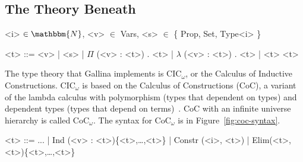 \subsection{The Theory Beneath}
\label{sec:mot-theory}

\begin{figure*}
\small
\begin{grammar}
<i> $\in \mathbbm{N}$, <v> $\in$ Vars, <s> $\in$ \{ Prop, Set, Type<i> \}

<t> ::= <v> \hspace{0.06cm} | \hspace{0.06cm} <s> \hspace{0.06cm} | \hspace{0.06cm} $\Pi$ (<v> : <t>) . <t> \hspace{0.06cm} | \hspace{0.06cm} $\lambda$ (<v> : <t>) . <t> \hspace{0.06cm} | \hspace{0.06cm} <t> <t>
\end{grammar}
\vspace{-0.3cm}
\caption{Syntax for CoC$_\omega$ with (from left to right) variables, sorts, dependent types, functions, and application.}
\label{fig:coc-syntax}
\end{figure*}

The type theory that Gallina implements is CIC$_{\omega}$, or the Calculus of Inductive Constructions.
CIC$_{\omega}$ is based on the Calculus of Constructions (CoC), a variant of the lambda calculus with polymorphism (types that dependent on types) and dependent types (types that depend on terms)~\cite{coquand:inria-00076024}.
CoC with an infinite universe hierarchy is called CoC$_{\omega}$. %
The syntax for CoC$_{\omega}$ is in Figure~\ref{fig:coc-syntax}.

\begin{figure*}
\small
\begin{grammar}
<t> ::= ... | \hspace{0.06cm} Ind (<v> : <t>)\{<t>,\ldots,<t>\} \hspace{0.06cm} | \hspace{0.06cm} Constr (<i>, <t>) \hspace{0.06cm} | \hspace{0.06cm} Elim(<t>, <t>)\{<t>,\ldots,<t>\}
\end{grammar}
\vspace{-0.3cm}
\caption{CIC$_\omega$ is CoC$_\omega$ with inductive types, inductive constructors, and eliminators.}
\label{fig:cic-syntax}
\end{figure*}

